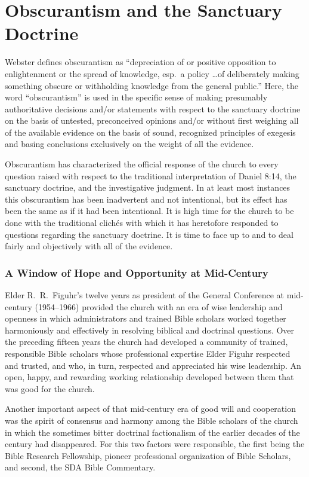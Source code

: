 \chapter{Obscurantism and the Sanctuary Doctrine}
\label{ch:obscurantism}

Webster defines obscurantism as ``depreciation of or positive opposition to
enlightenment or the spread of knowledge, esp.\ a policy \ldots of deliberately
making something obscure or withholding knowledge from the general public.''
Here, the word ``obscurantism'' is used in the specific sense of making
presumably authoritative decisions and/or statements with respect to the
sanctuary doctrine on the basis of untested, preconceived opinions and/or
without first weighing all of the available evidence on the basis of sound,
recognized principles of exegesis and basing conclusions exclusively on the
weight of all the evidence.

Obscurantism has characterized the official response of the church to every
question raised with respect to the traditional interpretation of Daniel
8:14, the sanctuary doctrine, and the investigative judgment. In at least
most instances this obscurantism has been inadvertent and not intentional,
but its effect has been the same as if it had been intentional. It is high
time for the church to be done with the traditional clichés with which it
has heretofore responded to questions regarding the sanctuary doctrine. It
is time to face up to and to deal fairly and objectively with all of the
evidence.

\subsection{A Window of Hope and Opportunity at Mid-Century}

Elder R.\ R.\ Figuhr's twelve years as president of the General Conference at
mid-century (1954--1966) provided the church with an era of wise leadership
and openness in which administrators and trained Bible scholars worked
together harmoniously and effectively in resolving biblical and doctrinal
questions. Over the preceding fifteen years the church had developed a
community of trained, responsible Bible scholars whose professional
expertise Elder Figuhr respected and trusted, and who, in turn, respected
and appreciated his wise leadership. An open, happy, and rewarding working
relationship developed between them that was good for the church.

Another important aspect of that mid-century era of good will and
cooperation was the spirit of consensus and harmony among the Bible scholars
of the church in which the sometimes bitter doctrinal factionalism of the
earlier decades of the century had disappeared. For this two factors were
responsible, the first being the Bible Research Fellowship, pioneer
professional organization of Bible Scholars, and second, the SDA Bible
Commentary.


